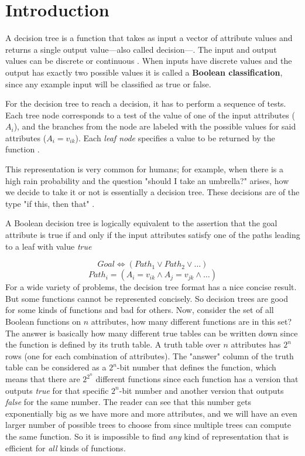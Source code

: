\documentclass[10pt]{article}
\begin{document}
\section{Introduction}
A decision tree is a function that takes as input a vector of attribute values and returns a single output value---also called decision---. The input and output values can be discrete or continuous \cite{ai}. When inputs have discrete values and the output has exactly two possible values it is called a \textbf{Boolean classification}, since any example input will be classified as true or false. \par
For the decision tree to reach a decision, it has to perform a sequence of tests. Each tree node corresponds to a test of the value of one of the input attributes ($A_{i}$), and the branches from the node are labeled with the possible values for said attributes ($A_{i} = v_{ik}$). Each \textit{leaf node} specifies a value to be returned by the function \cite{ai}. \par
This representation is very common for humans; for example, when there is a high rain probability and the question "should I take an umbrella?" arises, how we decide to take it or not is essentially a decision tree. These decisions are of the type "if this, then that" \cite{aprendeML}. \par
A Boolean decision tree is logically equivalent to the assertion that the goal attribute is true if and only if the input attributes satisfy one of the paths leading to a leaf with value \textit{true} \cite{ai} \par
\begin{equation*}
    Goal \Leftrightarrow (Path_{1} \vee Path_{2} \vee \dots)
\end{equation*}
\begin{equation*}
    Path_{i} = (A_{i} = v_{ik} \wedge A_{j} = v_{jk} \wedge \dots)
\end{equation*}
For a wide variety of problems, the decision tree format has a nice concise result. But some functions cannot be represented concisely. So decision trees are good for some kinds of functions and bad for others. Now, consider the set of all Boolean functions on $n$ attributes, how many different functions are in this set? The answer is basically how many different true tables can be written down since the function is defined by its truth table. A truth table over $n$ attributes has $2^{n}$ rows (one for each combination of attributes). The "answer" column of the truth table can be considered as a $2^{n}$-bit number that defines the function, which means that there are $2^{2^{n}}$ different functions since each function has a version that outputs \textit{true} for that specific $2^{n}$-bit number and another version that outputs \textit{false} for the same number. The reader can see that this number gets exponentially big as we have more and more attributes, and we will have an even larger number of possible trees to choose from since multiple trees can compute the same function. So it is impossible to find \textit{any} kind of representation that is efficient for \textit{all} kinds of functions. \cite{ai} \par
\end{document}
